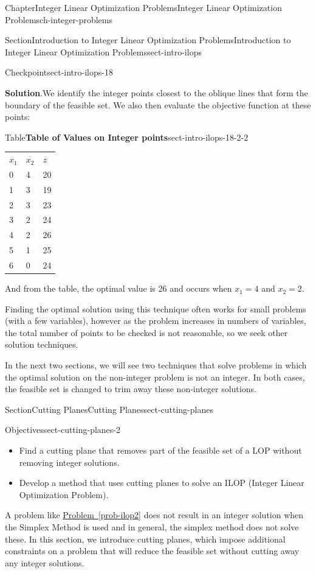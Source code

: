 \documentclass[oneside,10pt,]{book}
\newcommand{\blocktitlefont}{\relax}
\newcommand{\tabularfont}{\relax}
\newcommand{\xreffont}{\relax}
\numberwithin{equation}{section}
\newcommand{\hrulethin}  {\noalign{\hrule height 0.04em}}
\begin{document}
\begin{chapterptx}{Chapter}{Integer Linear Optimization Problems}{}{Integer Linear Optimization Problems}{}{}{ch-integer-problems}
\begin{sectionptx}{Section}{Introduction to Integer Linear Optimization Problems}{}{Introduction to Integer Linear Optimization Problems}{}{}{sect-intro-ilops}
\begin{inlineexercise}{Checkpoint}{}{sect-intro-ilops-18}
\par\smallskip%
\noindent\textbf{\blocktitlefont Solution}.\hypertarget{sect-intro-ilops-18-2}{}\quad{}We identify the integer points closest to the oblique lines that form the boundary of the feasible set. We also then evaluate the objective function at these points:%
\begin{tableptx}{Table}{\textbf{Table of Values on Integer points}}{sect-intro-ilops-18-2-2}{}%
\centering%
{\tabularfont%
\begin{tabular}{lll}
\(x_1\)&\(x_2\)&\(z\)\tabularnewline\hrulethin
0&4&20\tabularnewline[0pt]
1&3&19\tabularnewline[0pt]
2&3&23\tabularnewline[0pt]
3&2&24\tabularnewline[0pt]
4&2&26\tabularnewline[0pt]
5&1&25\tabularnewline[0pt]
6&0&24
\end{tabular}
}%
\end{tableptx}%
And from the table, the optimal value is 26 and occurs when \(x_1=4\) and \(x_2=2\).%
\par
Finding the optimal solution using this technique often works for small problems (with a few variables), however as the problem increases in numbers of variables, the total number of points to be checked is not reasonable, so we seek other solution techniques.%
\end{inlineexercise}%
In the next two sections, we will see two techniques that solve problems in which the optimal solution on the non-integer problem is not an integer. In both cases, the feasible set is changed to trim away these non-integer solutions.%
\end{sectionptx}
%
%
\typeout{************************************************}
\typeout{************************************************}
%
\begin{sectionptx}{Section}{Cutting Planes}{}{Cutting Planes}{}{}{sect-cutting-planes}
\begin{objectives}{Objectives}{sect-cutting-planes-2}
%
\begin{itemize}[label=\textbullet]
\item{}Find a cutting plane that removes part of the feasible set of a LOP without removing integer solutions.%
\item{}Develop a method that uses cutting planes to solve an ILOP (Integer Linear Optimization Problem).%
\end{itemize}
\end{objectives}
\begin{introduction}{}%
A problem like \hyperref[prob-ilop2]{Problem~{\xreffont\ref{prob-ilop2}}} does not result in an integer solution when the Simplex Method is used and in general, the simplex method does not solve these. In this section, we introduce cutting planes, which impose additional constraints on a problem that will reduce the feasible set without cutting away any integer solutions.%

\end{introduction}
\end{sectionptx}
\end{chapterptx}
\end{document}
